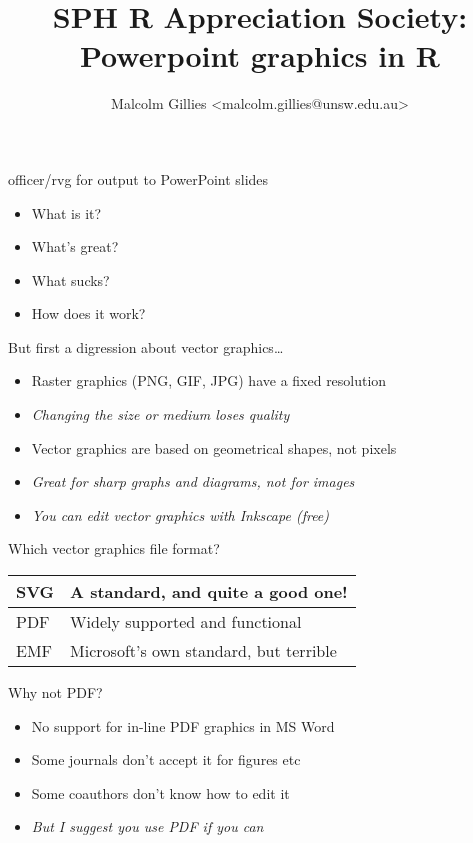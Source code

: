 \documentclass[aspectratio=169,12pt]{beamer} %
\title{SPH R Appreciation Society:\\Powerpoint graphics in R}
\author{Malcolm Gillies <malcolm.gillies@unsw.edu.au>}
\institute{20 May 2024}
\begin{document}

\begin{frame}[plain]
\titlepage
\end{frame}

\begin{frame}{officer/rvg for output to PowerPoint slides}
	\begin{itemize}
		\item What is it?
		\item What's great?
		\item What sucks?
		\item How does it work?
	\end{itemize}
\end{frame}

\begin{frame}{But first a digression about vector graphics\dots}
	\begin{itemize}
		\item Raster graphics (PNG, GIF, JPG) have a fixed resolution
		\item \emph{Changing the size or medium loses quality}
		\item Vector graphics are based on geometrical shapes, not pixels
		\item \emph{Great for sharp graphs and diagrams, not for images}
		\item \emph{You can edit vector graphics with Inkscape (free)}
	\end{itemize}
\end{frame}

\begin{frame}{Which vector graphics file format?}
	\center
	\begin{tabular}{|l|l|}
	\hline
	SVG & A standard, and quite a good one! \\
	\hline
	PDF & Widely supported and functional \\
	\hline
	EMF & Microsoft's own standard, but terrible \\
	\hline
	\end{tabular}
\end{frame}

\begin{frame}{Why not PDF?}
	\begin{itemize}
		\item No support for in-line PDF graphics in MS Word
		\item Some journals don't accept it for figures etc
		\item Some coauthors don't know how to edit it
		\item \emph{But I suggest you use PDF if you can}
	\end{itemize}
\end{frame}
\end{document}

